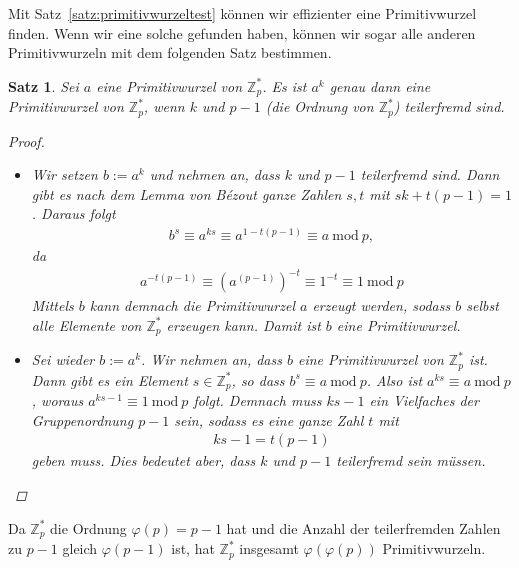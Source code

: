 \documentclass[
  a4paper,
  11pt,
]{scrartcl}
\theoremstyle{plain}
\newtheorem{satz}{Satz}
\theoremstyle{definition}
\theoremstyle{remark}
\newcommand{\Z}{\mathbb{Z}}
\newcommand{\Mod}[1]{\ \mathrm{mod}\ #1}
\begin{document}
Mit Satz~\ref{satz:primitivwurzeltest} können wir effizienter eine
Primitivwurzel finden. Wenn wir eine solche gefunden haben, können wir sogar
alle anderen Primitivwurzeln mit dem folgenden Satz bestimmen.

\begin{satz}\label{satz:primitivwurzeln_durch_potenzen}
  Sei $a$ eine Primitivwurzel von $\Z_p^*$. Es ist $a^k$ genau dann eine
  Primitivwurzel von $\Z_p^*$, wenn $k$ und $p-1$ (die Ordnung von $\Z_p^*$)
  teilerfremd sind.

  \begin{proof}
    \begin{itemize}
      \item[„$\Rightarrow$“] Wir setzen $b := a^k$ und nehmen an, dass $k$ und
        $p-1$ teilerfremd sind. Dann gibt es nach dem Lemma von Bézout ganze
        Zahlen $s, t$ mit $s k + t (p-1) = 1$. Daraus folgt
        \begin{align*}
          b^s \equiv a^{k s} \equiv a^{1 - t (p-1)} \equiv a \Mod{p},
        \end{align*}
        da
        \begin{align*}
          a^{- t (p-1)} \equiv {\left(a^{(p-1)}\right)}^{-t} \equiv 1^{-t} \equiv 1 \Mod{p}
        \end{align*}
        Mittels $b$ kann demnach die Primitivwurzel $a$ erzeugt werden, sodass
        $b$ selbst alle Elemente von $\Z_p^*$ erzeugen kann. Damit ist $b$ eine
        Primitivwurzel.
      \item[„$\Leftarrow$“] Sei wieder $b := a^k$. Wir nehmen an, dass $b$ eine
        Primitivwurzel von $\Z_p^*$ ist. Dann gibt es ein Element
        $s \in \Z_p^*$, so dass $b^s \equiv a \Mod{p}$. Also ist
        $a^{ks} \equiv a \Mod{p}$, woraus $a^{ks - 1} \equiv 1 \Mod{p}$ folgt.
        Demnach muss $ks-1$ ein Vielfaches der Gruppenordnung $p-1$ sein, sodass
        es eine ganze Zahl $t$ mit
        \begin{align*}
          ks - 1 = t(p-1)
        \end{align*}
        geben muss. Dies bedeutet aber, dass $k$ und $p-1$ teilerfremd sein
        müssen.
    \end{itemize}
  \end{proof}
\end{satz}

Da $\Z_p^*$ die Ordnung $\varphi(p) = p-1$ hat und die Anzahl der teilerfremden
Zahlen zu $p-1$ gleich $\varphi(p-1)$ ist, hat $\Z_p^*$ insgesamt
$\varphi(\varphi(p))$ Primitivwurzeln.
\end{document}
